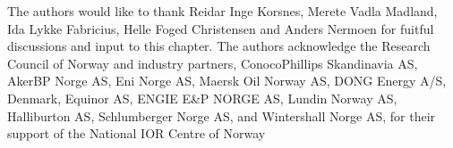 The authors would like to thank Reidar Inge Korsnes, Merete Vadla Madland, Ida Lykke Fabricius, Helle Foged Christensen and Anders Nermoen for fuitful discussions and input to this chapter.
The authors acknowledge the Research Council of Norway and industry partners, ConocoPhillips Skandinavia AS, AkerBP Norge AS, Eni Norge AS, Maersk Oil Norway AS, DONG Energy A/S, Denmark, Equinor AS, ENGIE E\&P NORGE AS, Lundin Norway AS, Halliburton AS, Schlumberger Norge AS, and Wintershall Norge AS, for their support of the National IOR Centre of Norway